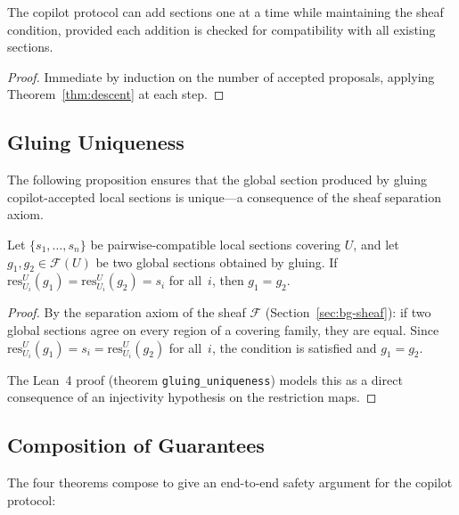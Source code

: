 \documentclass[11pt]{article}
\newcommand{\sheaf}{\mathcal{F}}
\newcommand{\restrict}{\mathrm{res}}
\begin{document}
\begin{corollary}\label{cor:incremental}
The copilot protocol can add sections one at a time while
maintaining the sheaf condition, provided each addition is checked
for compatibility with all existing sections.
\end{corollary}

\begin{proof}
Immediate by induction on the number of accepted proposals, applying
Theorem~\ref{thm:descent} at each step.
\end{proof}

\subsection{Gluing Uniqueness}\label{sec:formal-gluing}

The following proposition ensures that the global section produced
by gluing copilot-accepted local sections is unique---a consequence
of the sheaf separation axiom.

\begin{proposition}\label{prop:glue-unique}
Let $\{s_1, \ldots, s_n\}$ be pairwise-compatible local sections
covering $U$, and let $g_1, g_2 \in \sheaf(U)$ be two global
sections obtained by gluing.  If $\restrict^U_{U_i}(g_1)
= \restrict^U_{U_i}(g_2) = s_i$ for all~$i$, then $g_1 = g_2$.
\end{proposition}

\begin{proof}
By the separation axiom of the sheaf $\sheaf$
(Section~\ref{sec:bg-sheaf}): if two global sections agree on
every region of a covering family, they are equal.  Since
$\restrict^U_{U_i}(g_1) = s_i = \restrict^U_{U_i}(g_2)$ for
all~$i$, the condition is satisfied and $g_1 = g_2$.

The Lean~4 proof (theorem \texttt{gluing\_uniqueness}) models
this as a direct consequence of an injectivity hypothesis on the
restriction maps.
\end{proof}

\subsection{Composition of Guarantees}\label{sec:formal-compose}

The four theorems compose to give an end-to-end safety argument
for the copilot protocol:
\end{document}
